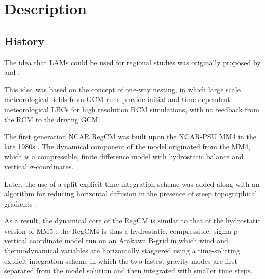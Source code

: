 
\chapter{Description}

\section{History}

The idea that \ac{LAMs} could be used for regional studies was originally
proposed by \citet{Dickinson_89} and \citet{Giorgi_90}.

This idea was based on the concept of one-way nesting, in which large scale
meteorological fields from \ac{GCM} runs provide initial and time-dependent
meteorological \ac{LBCs} for high resolution \ac{RCM} simulations, with no
feedback from the \ac{RCM} to the driving \ac{GCM}.

The first generation NCAR \ac{RegCM} was built upon the \ac{NCAR}-\ac{PSU}
\ac{MM4} in the late 1980s \citep{Dickinson_89, Giorgi_89}. The dynamical
component of the model originated from the \ac{MM4}, which is a compressible,
finite difference model with hydrostatic balance and vertical
$\sigma$-coordinates.

Later, the use of a split-explicit time integration scheme was added along
with an algorithm for reducing horizontal diffusion in the presence of steep
topographical gradients \citep{Giorgi_93,Giorgi_93b}.

As a result, the dynamical core of the \ac{RegCM} is similar to that of the
hydrostatic version of \ac{MM5} \citep{Grell_94}: the \ac{RegCM}4 is thus a
hydrostatic, compressible, sigma-p vertical coordinate model run on an
Arakawa B-grid in which wind and thermodynamical variables are horizontally
staggered using a time-splitting explicit integration scheme in which the two
fastest gravity modes are first separated from the model solution and then
integrated with smaller time steps.


